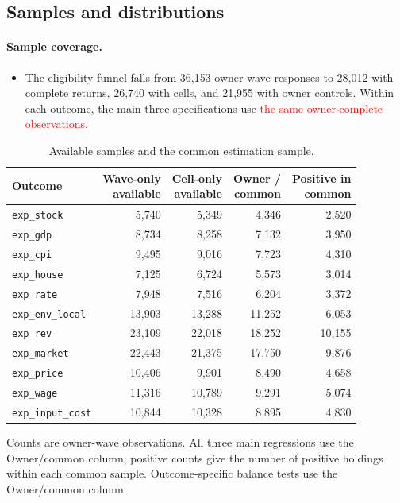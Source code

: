 \documentclass[11pt,letterpaper,english,final]{article}
\begin{document}
\subsection{Samples and distributions}
\paragraph{Sample coverage.}
\begin{itemize}
\item The eligibility funnel falls from 36,153 owner-wave responses to 28,012 with complete returns, 26,740 with cells, and 21,955 with owner controls. Within each outcome, the main three specifications use \textcolor{red}{the same owner-complete observations}.


\end{itemize}

\begin{table}[H]
\centering\small
\setlength{\tabcolsep}{4pt}
\caption{Available samples and the common estimation sample.}
\begin{tabular}{lrrrr}
\toprule
Outcome & \shortstack{Wave-only\\available} & \shortstack{Cell-only\\available} & \shortstack{Owner /\\common} & \shortstack{Positive in\\common} \\
\midrule
\texttt{exp\_stock} & 5,740 & 5,349 & 4,346 & 2,520 \\
\texttt{exp\_gdp} & 8,734 & 8,258 & 7,132 & 3,950 \\
\texttt{exp\_cpi} & 9,495 & 9,016 & 7,723 & 4,310 \\
\texttt{exp\_house} & 7,125 & 6,724 & 5,573 & 3,014 \\
\texttt{exp\_rate} & 7,948 & 7,516 & 6,204 & 3,372 \\
\texttt{exp\_env\_local} & 13,903 & 13,288 & 11,252 & 6,053 \\
\texttt{exp\_rev} & 23,109 & 22,018 & 18,252 & 10,155 \\
\texttt{exp\_market} & 22,443 & 21,375 & 17,750 & 9,876 \\
\texttt{exp\_price} & 10,406 & 9,901 & 8,490 & 4,658 \\
\texttt{exp\_wage} & 11,316 & 10,789 & 9,291 & 5,074 \\
\texttt{exp\_input\_cost} & 10,844 & 10,328 & 8,895 & 4,830 \\
\bottomrule
\end{tabular}
\par\vspace{4pt}\begin{minipage}{\linewidth}\footnotesize Counts are owner-wave observations. All three main regressions use the Owner/common column; positive counts give the number of positive holdings within each common sample. Outcome-specific balance tests use the Owner/common column.\end{minipage}
\end{table}
\end{document}
